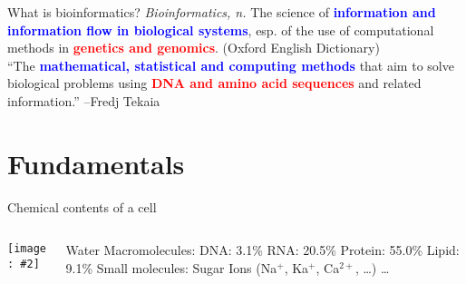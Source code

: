 \documentclass{beamer}
\renewcommand{\c}[1]{\begin{center}#1\end{center}}
\newcommand{\blu}[1]{\textcolor{blue}{\textbf{#1}}}
\newcommand{\red}[1]{\textcolor{red}{\textbf{#1}}}
\newcommand{\gr}[2][.95]{\c{\texttt{[image: \#2]}}}
\begin{document}
\begin{frame}{What is bioinformatics?}
\textit{Bioinformatics, n.} The science of \blu{information and information flow in biological systems}, esp. of the use of computational methods in \red{genetics and genomics}. (Oxford English Dictionary)\\
\bigskip
``The \blu{mathematical, statistical and computing methods} that aim to solve biological problems using \red{DNA and amino acid sequences} and related information.'' --Fredj Tekaia
\end{frame}

\section{Fundamentals}

\begin{frame}{Chemical contents of a cell}
\begin{columns}
    \begin{column}{0.4\textwidth}
        \gr{l1_figs/s7_cell.png}
    \end{column}
    \begin{column}{0.6\textwidth}
        \begin{outline}
            \1[] Water
            \1[] Macromolecules:
                \2 DNA: 3.1\%
                \2 RNA: 20.5\%
                \2 Protein: 55.0\%
                \2 Lipid: 9.1\%
            \1[] Small molecules:
                \2 Sugar
                \2 Ions (Na$^+$, Ka$^+$, Ca$^{2+}$, \ldots)
                \2 \ldots
        \end{outline}
    \end{column}
\end{columns}
\end{frame}
\end{document}
